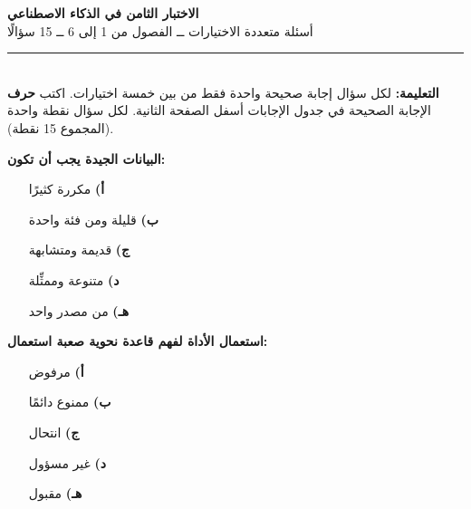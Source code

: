 \documentclass[11pt,a4paper]{article}
\begin{document}
\begin{center}
{\Large\khatt\textbf{الاختبار الثامن في الذكاء الاصطناعي}}\\[2pt]
{\normalsize أسئلة متعددة الاختيارات ــ الفصول من 1 إلى 6 ــ 15 سؤالًا}
\end{center}
\vspace{-4pt}\rule{\textwidth}{0.6pt}\\
{\small\textbf{التعليمة:} لكل سؤال إجابة صحيحة واحدة فقط من بين خمسة اختيارات.
اكتب \textbf{حرف} الإجابة الصحيحة في جدول الإجابات أسفل الصفحة الثانية.
لكل سؤال نقطة واحدة (المجموع 15 نقطة).}
\vspace{-2pt}
\begin{multicols}{2}

\noindent\begin{minipage}{\linewidth}
\hangindent=0.7cm\textbf{البيانات الجيدة يجب أن تكون:}
\begin{itemize}[leftmargin=0.95cm, labelsep=4pt, itemsep=0pt, topsep=2pt, parsep=0pt]
  \item[\textbf{أ)}] مكررة كثيرًا
  \item[\textbf{ب)}] قليلة ومن فئة واحدة
  \item[\textbf{ج)}] قديمة ومتشابهة
  \item[\textbf{د)}] متنوعة وممثِّلة
  \item[\textbf{هـ)}] من مصدر واحد
\end{itemize}
\end{minipage}\par\vspace{7pt plus 4pt}
\noindent\begin{minipage}{\linewidth}
\hangindent=0.7cm\textbf{استعمال الأداة لفهم قاعدة نحوية صعبة استعمال:}
\begin{itemize}[leftmargin=0.95cm, labelsep=4pt, itemsep=0pt, topsep=2pt, parsep=0pt]
  \item[\textbf{أ)}] مرفوض
  \item[\textbf{ب)}] ممنوع دائمًا
  \item[\textbf{ج)}] انتحال
  \item[\textbf{د)}] غير مسؤول
  \item[\textbf{هـ)}] مقبول
\end{itemize}
\end{minipage}\par\vspace{7pt plus 4pt}
\noindent\begin{minipage}{\linewidth}

\end{minipage}
\end{multicols}
\end{document}
